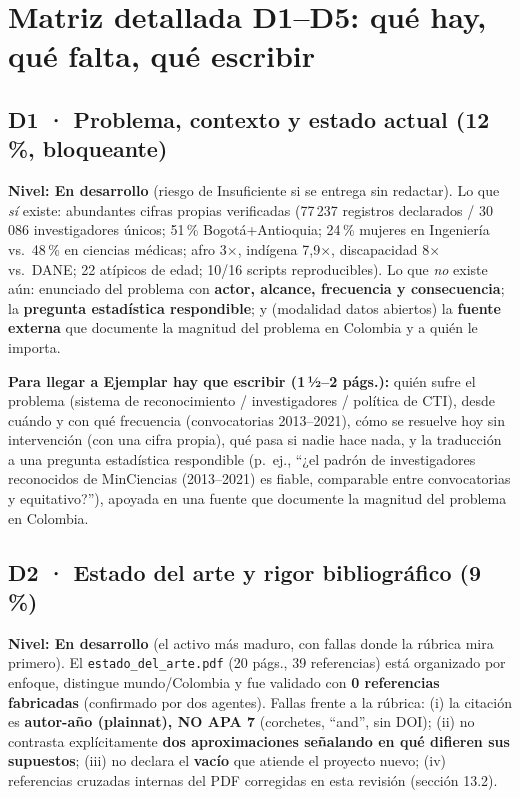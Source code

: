 \section{Matriz detallada D1--D5: qué hay, qué falta, qué escribir}

\subsection{D1 · Problema, contexto y estado actual (12\,\%, bloqueante)}

\textbf{Nivel: En desarrollo} (riesgo de Insuficiente si se entrega sin
redactar). Lo que \emph{sí} existe: abundantes cifras propias verificadas
(77\,237 registros declarados / 30\,086 investigadores únicos; 51\,\%
Bogotá+Antioquia; 24\,\% mujeres en Ingeniería vs.\ 48\,\% en ciencias médicas;
afro 3$\times$, indígena 7,9$\times$, discapacidad 8$\times$ vs.\ DANE; 22
atípicos de edad; 10/16 scripts reproducibles). Lo que \emph{no} existe aún:
enunciado del problema con \textbf{actor, alcance, frecuencia y consecuencia};
la \textbf{pregunta estadística respondible}; y (modalidad datos abiertos) la
\textbf{fuente externa} que documente la magnitud del problema en Colombia y a
quién le importa.

\begin{tcolorbox}[nota]
\textbf{Para llegar a Ejemplar hay que escribir (1\,½--2 págs.):} quién sufre el
problema (sistema de reconocimiento / investigadores / política de CTI), desde
cuándo y con qué frecuencia (convocatorias 2013--2021), cómo se resuelve hoy
sin intervención (con una cifra propia), qué pasa si nadie hace nada, y la
traducción a una pregunta estadística respondible (p.~ej., ``¿el padrón de
investigadores reconocidos de MinCiencias (2013--2021) es fiable, comparable
entre convocatorias y equitativo?''), apoyada en una fuente que documente la
magnitud del problema en Colombia.
\end{tcolorbox}

\subsection{D2 · Estado del arte y rigor bibliográfico (9\,\%)}

\textbf{Nivel: En desarrollo} (el activo más maduro, con fallas donde la rúbrica
mira primero). El \texttt{estado\_del\_arte.pdf} (20 págs., 39 referencias)
está organizado por enfoque, distingue mundo/Colombia y fue validado con
\textbf{0 referencias fabricadas} (confirmado por dos agentes). Fallas frente a
la rúbrica: (i) la citación es \textbf{autor-año (plainnat), NO APA 7}
(corchetes, ``and'', sin DOI); (ii) no contrasta explícitamente \textbf{dos
aproximaciones señalando en qué difieren sus supuestos}; (iii) no declara el
\textbf{vacío} que atiende el proyecto nuevo; (iv) referencias cruzadas internas
del PDF corregidas en esta revisión (sección 13.2).

